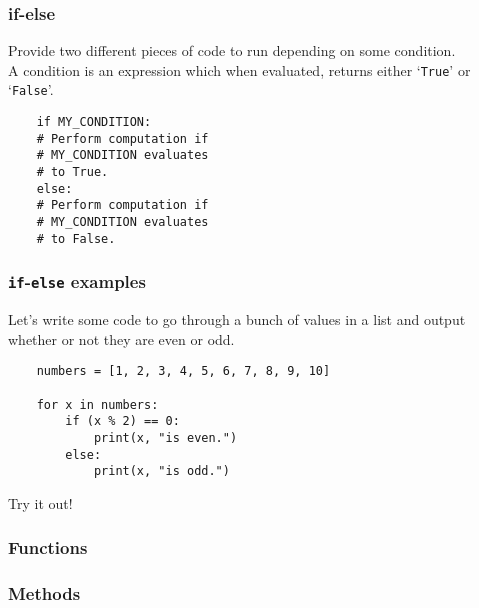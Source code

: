 \documentclass[notes]{beamer}
\begin{document}
\begin{frame}[fragile]
	\frametitle{if-else}
	
	Provide two different pieces of code to run depending on some condition.\\
    \pause
    A condition is an expression which when evaluated, returns either `\lstinline|True|' or `\lstinline|False|'.
	
    \pause	
	\begin{lstlisting}
	if MY_CONDITION:
    # Perform computation if
    # MY_CONDITION evaluates
    # to True.
	else:
    # Perform computation if
    # MY_CONDITION evaluates
    # to False.
	\end{lstlisting}
\end{frame}

\begin{frame}[fragile]
    \frametitle{\lstinline|if|-\lstinline|else| examples}

    Let's write some code to go through a bunch of values in a list and output whether or not they are even or odd.
    
	\pause
	\begin{lstlisting}
	numbers = [1, 2, 3, 4, 5, 6, 7, 8, 9, 10]

	for x in numbers:
	    if (x % 2) == 0:
	        print(x, "is even.")
	    else:
	        print(x, "is odd.")
	\end{lstlisting}
	\pause
	Try it out!
\end{frame}

\begin{frame}[fragile]
	\frametitle{}
	
\end{frame}

\begin{frame}[fragile]
	\frametitle{Functions}
\end{frame}

\begin{frame}[fragile]
	\frametitle{Methods}
\end{frame}
\end{document}
